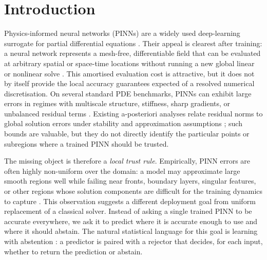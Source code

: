 \section{Introduction}
\label{sec:intro}

Physics-informed neural networks (PINNs) are a widely used deep-learning
surrogate for partial differential equations
\citep{raissi2019physics,karniadakis2021physics,cuomo2022scientific,
lu2021deepxde}. Their appeal is clearest after training: a neural network
represents a mesh-free, differentiable field that can be evaluated at
arbitrary spatial or space-time locations without running a new global
linear or nonlinear solve \citep{leveque2007finite,brenner2008mathematical}.
This amortised evaluation cost is attractive, but it does not by itself
provide the local accuracy guarantees expected of a resolved numerical
discretisation. On several standard PDE benchmarks, PINNs can exhibit large
errors in regimes with multiscale structure, stiffness, sharp gradients, or
unbalanced residual terms \citep{krishnapriyan2021,wang2022whenpinns,
wang2021understanding}. Existing a-posteriori analyses relate residual
norms to global solution errors under stability and approximation
assumptions \citep{mishra2022estimates}; such bounds are valuable, but they
do not directly identify the particular points or subregions where a trained
PINN should be trusted.

The missing object is therefore a \emph{local trust rule}. Empirically, PINN
errors are often highly non-uniform over the domain: a model may approximate
large smooth regions well while failing near fronts, boundary layers,
singular features, or other regions whose solution components are difficult
for the training dynamics to capture \citep{krishnapriyan2021,
wang2022whenpinns,wang2022respecting}. This observation suggests a different
deployment goal from uniform replacement of a classical solver. Instead of
asking a single trained PINN to be accurate everywhere, we ask it to predict
where it is accurate enough to use and where it should abstain. The natural
statistical language for this goal is learning with abstention
\citep{chow1970,bartlett2008classification,Geifman_El-Yaniv_2017,cortes,
cortes2024theory,cao2022generalizing,ni2019calibration,Mao_Mohri_Zhong_2023,
theoretically}: a predictor is paired with a rejector that decides, for each
input, whether to return the prediction or abstain.


